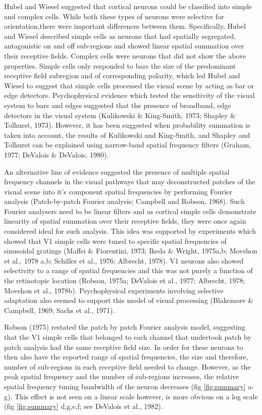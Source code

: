 	Hubel and Wiesel suggested that cortical neurons could be classified into simple and complex cells. While both these types of neurons were selective for orientation,there were important differences between them. Specifically, Hubel and Wiesel described simple cells as neurons that had spatially segregated, antagonistic on and off sub-regions and showed linear spatial summation over their receptive fields. Complex cells were neurons that did not show the above properties. Simple cells only responded to bars the size of the predominant receptive field subregion and of corresponding polarity, which led Hubel and Wiesel to suggest that simple cells processed the visual scene by acting as bar or edge detectors. Psychophysical evidence which tested the sensitivity of the visual system to bars and edges suggested that the presence of broadband, edge detectors in the visual system (Kulikowski \& King-Smith, 1973; Shapley \& Tolhurst, 1973). However, it has been suggested when probability summation is taken into account, the results of Kulikowski and King-Smith, and Shapley and Tolhurst can be explained using narrow-band spatial frequency filters (Graham, 1977; DeValois \& DeValois, 1980).
	
	An alternative line of evidence suggested the presence of multiple spatial frequency channels in the visual pathways that may deconstructed patches of the visual scene into it's component spatial frequencies by performing Fourier analysis (Patch-by-patch Fourier analysis; Campbell and Robson, 1968). Such Fourier analysers need to be linear filters and as cortical simple cells demonstrate linearity of spatial summation over their receptive fields, they were once again considered ideal for such analysis. This idea was supported by experiments which showed that V1 simple cells were tuned to specific spatial frequencies of sinusoidal gratings (Maffei \& Fiorentini, 1973; Ikeda \& Wright, 1975a,b; Movshon et al., 1978 a,b; Schiller et al., 1976; Albrecht, 1978). V1 neurons also showed selectivity to a range of spatial frequencies and this was not purely a function of the retinotopic location (Robson, 1975a; DeValois et al., 1977; Albrecht, 1978; Movshon et al., 1978b). Psychophysical experiments involving selective adaptation also seemed to support this model of visual processing (Blakemore \& Campbell, 1969; Sachs et al., 1971).
	
	Robson (1975) restated the patch by patch Fourier analysis model, suggesting that the V1 simple cells that belonged to each channel that undertook patch by patch analysis had the same receptive field size. In order for these neurons to then also have the reported range of spatial frequencies, the size and therefore, number of sub-regions in each receptive field needed to change. However, as the peak spatial frequency and the number of sub-regions increases, the relative spatial frequency tuning bandwidth of the neuron decreases (fig \ref{fig:summary} a-g). This effect is not seen on a linear scale however, is more obvious on a log scale (fig \ref{fig:summary} d,g,e,f; see DeValois et al., 1982).
	
